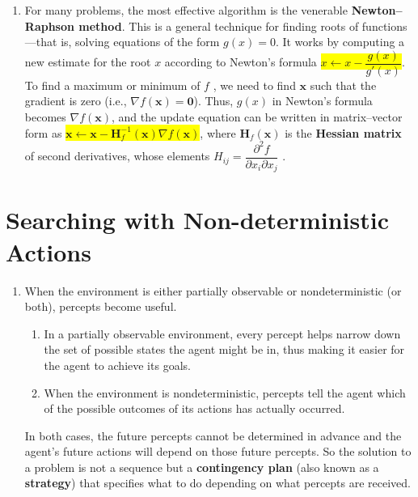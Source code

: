 \begin{enumerate}
    \item For many problems, the most effective algorithm is the venerable \textbf{Newton–Raphson method}.
    This is a general technique for finding roots of functions—that is, solving equations of the form $g(x) = 0$.
    It works by computing a new estimate for the root $x$ according to Newton’s formula \colorbox{yellow}{$x \gets x - \dfrac{g(x)}{g'(x)}$}.
    To find a maximum or minimum of $f$ , we need to find $\bm{x}$ such that the gradient is zero (i.e., $\nabla f (\bm{x}) = \bm{0}$).
    Thus, $g(x)$ in Newton’s formula becomes $\nabla f (\bm{x})$, and the update equation can be written in matrix–vector form as \colorbox{yellow}{$\bm{x} \gets \bm{x} - \bm{H}_f^{-1}(\bm{x})\nabla f(\bm{x})$}, where $\bm{H}_f (\bm{x})$ is the \textbf{Hessian matrix} of second derivatives, whose elements $H_{ij} = \dfrac{ \partial ^2f}{ \partial x_i \partial x_j}$ .
    \hfill \cite{ai/book/Artificial-Intelligence-A-Modern-Approach/Russell-Norvig}
\end{enumerate}



\clearpage
\section{Searching with Non-deterministic Actions}

\begin{enumerate}
    \item When the environment is either partially observable or nondeterministic (or both), percepts become useful.
    \hfill \cite{ai/book/Artificial-Intelligence-A-Modern-Approach/Russell-Norvig}
    \begin{enumerate}
        \item In a partially observable environment, every percept helps narrow down the set of possible states the agent might be in, thus making it easier for the agent to achieve its goals.
        \hfill \cite{ai/book/Artificial-Intelligence-A-Modern-Approach/Russell-Norvig}

        \item When the environment is nondeterministic, percepts tell the agent which of the possible outcomes of its actions has actually occurred.
        \hfill \cite{ai/book/Artificial-Intelligence-A-Modern-Approach/Russell-Norvig}
    \end{enumerate}
    In both cases, the future percepts cannot be determined in advance and the agent’s future actions will depend on those future percepts.
    So the solution to a problem is not a sequence but a \textbf{contingency plan} (also known as a \textbf{strategy}) that specifies what to do depending on what percepts are received.
    \hfill \cite{ai/book/Artificial-Intelligence-A-Modern-Approach/Russell-Norvig}
\end{enumerate}













\clearpage


